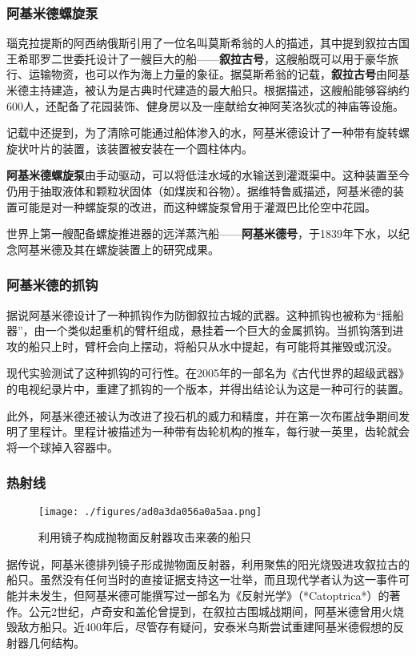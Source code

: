\subsubsection{阿基米德螺旋泵}
瑙克拉提斯的阿西纳俄斯引用了一位名叫莫斯希翁的人的描述，其中提到叙拉古国王希耶罗二世委托设计了一艘巨大的船——\textbf{叙拉古号}，这艘船既可以用于豪华旅行、运输物资，也可以作为海上力量的象征。据莫斯希翁的记载，\textbf{叙拉古号}由阿基米德主持建造，被认为是古典时代建造的最大船只。根据描述，这艘船能够容纳约600人，还配备了花园装饰、健身房以及一座献给女神阿芙洛狄忒的神庙等设施。  

记载中还提到，为了清除可能通过船体渗入的水，阿基米德设计了一种带有旋转螺旋状叶片的装置，该装置被安装在一个圆柱体内。  

\textbf{阿基米德螺旋泵}由手动驱动，可以将低洼水域的水输送到灌溉渠中。这种装置至今仍用于抽取液体和颗粒状固体（如煤炭和谷物）。据维特鲁威描述，阿基米德的装置可能是对一种螺旋泵的改进，而这种螺旋泵曾用于灌溉巴比伦空中花园。  

世界上第一艘配备螺旋推进器的远洋蒸汽船——\textbf{阿基米德号}，于1839年下水，以纪念阿基米德及其在螺旋装置上的研究成果。
\subsubsection{阿基米德的抓钩}
据说阿基米德设计了一种抓钩作为防御叙拉古城的武器。这种抓钩也被称为“摇船器”，由一个类似起重机的臂杆组成，悬挂着一个巨大的金属抓钩。当抓钩落到进攻的船只上时，臂杆会向上摆动，将船只从水中提起，有可能将其摧毁或沉没。  

现代实验测试了这种抓钩的可行性。在2005年的一部名为《古代世界的超级武器》的电视纪录片中，重建了抓钩的一个版本，并得出结论认为这是一种可行的装置。  

此外，阿基米德还被认为改进了投石机的威力和精度，并在第一次布匿战争期间发明了里程计。里程计被描述为一种带有齿轮机构的推车，每行驶一英里，齿轮就会将一个球掉入容器中。
\subsubsection{热射线}
\begin{figure}[ht]
\centering
\texttt{[image: ./figures/ad0a3da056a0a5aa.png]}
\caption{利用镜子构成抛物面反射器攻击来袭的船只} \label{fig_Archim_4}
\end{figure}
据传说，阿基米德排列镜子形成抛物面反射器，利用聚焦的阳光烧毁进攻叙拉古的船只。虽然没有任何当时的直接证据支持这一壮举，而且现代学者认为这一事件可能并未发生，但阿基米德可能撰写过一部名为《反射光学》（*Catoptrica*）的著作。公元2世纪，卢奇安和盖伦曾提到，在叙拉古围城战期间，阿基米德曾用火烧毁敌方船只。近400年后，尽管存有疑问，安泰米乌斯尝试重建阿基米德假想的反射器几何结构。  


